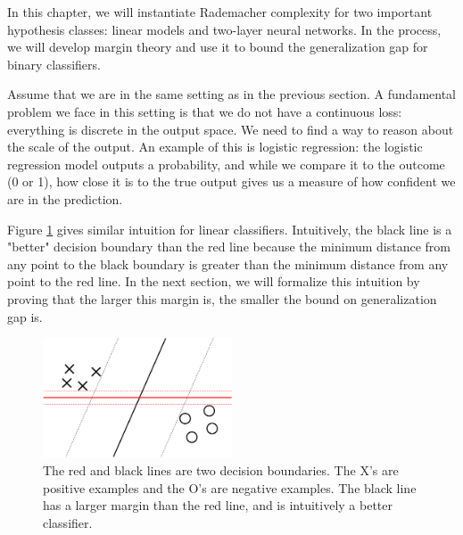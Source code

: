 

In this chapter, we will instantiate Rademacher complexity for two important hypothesis classes: linear models and two-layer neural networks. In the process, we will develop margin theory and use it to bound the generalization gap for binary classifiers.


Assume that we are in the same setting as in the previous section. A fundamental problem we face in this setting is that we do not have a continuous loss: everything is discrete in the output space. We need to find a way to reason about the scale of the output. An example of this is logistic regression: the logistic regression model outputs a probability, and while we compare it to the outcome (0 or 1), how close it is to the true output gives us a measure of how confident we are in the prediction.

Figure \ref{lec6:fig:margin} gives similar intuition for linear classifiers. Intuitively, the black line is a "better" decision boundary than the red line because the minimum distance from any point to the black boundary is greater than the minimum distance from any point to the red line. In the next section, we will formalize this intuition by proving that the larger this margin is, the smaller the bound on generalization gap is.

\begin{figure}[ht!]
    \begin{center}
  \includegraphics[width=0.5\textwidth]{figures/margin.png}
  \end{center}
  \caption{The red and black lines are two decision boundaries. The X's are positive examples and the O's are negative examples. The black line has a larger margin than the red line, and is intuitively a better classifier.}
  \label{lec6:fig:margin}
\end{figure}

